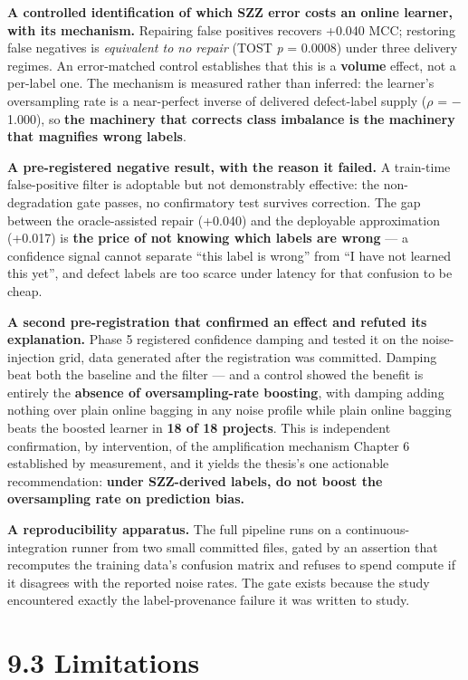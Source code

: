 \textbf{A controlled identification of which SZZ error costs an online
learner, with its mechanism.} Repairing false positives recovers +0.040
MCC; restoring false negatives is \emph{equivalent to no repair} (TOST
\emph{p} = 0.0008) under three delivery regimes. An error-matched
control establishes that this is a \textbf{volume} effect, not a
per-label one. The mechanism is measured rather than inferred: the
learner's oversampling rate is a near-perfect inverse of delivered
defect-label supply (\ensuremath{\rho} = \ensuremath{-}1.000), so \textbf{the machinery that corrects
class imbalance is the machinery that magnifies wrong labels}.

\textbf{A pre-registered negative result, with the reason it failed.} A
train-time false-positive filter is adoptable but not demonstrably
effective: the non-degradation gate passes, no confirmatory test
survives correction. The gap between the oracle-assisted repair (+0.040)
and the deployable approximation (+0.017) is \textbf{the price of not
knowing which labels are wrong} --- a confidence signal cannot separate
``this label is wrong'' from ``I have not learned this yet'', and defect
labels are too scarce under latency for that confusion to be cheap.

\textbf{A second pre-registration that confirmed an effect and refuted
its explanation.} Phase 5 registered confidence damping and tested it on
the noise-injection grid, data generated after the registration was
committed. Damping beat both the baseline and the filter --- and a
control showed the benefit is entirely the \textbf{absence of
oversampling-rate boosting}, with damping adding nothing over plain
online bagging in any noise profile while plain online bagging beats the
boosted learner in \textbf{18 of 18 projects}. This is independent
confirmation, by intervention, of the amplification mechanism Chapter 6
established by measurement, and it yields the thesis's one actionable
recommendation: \textbf{under SZZ-derived labels, do not boost the
oversampling rate on prediction bias.}

\textbf{A reproducibility apparatus.} The full pipeline runs on a
continuous-integration runner from two small committed files, gated by
an assertion that recomputes the training data's confusion matrix and
refuses to spend compute if it disagrees with the reported noise rates.
The gate exists because the study encountered exactly the
label-provenance failure it was written to study.

\section{9.3 Limitations}\label{limitations}

